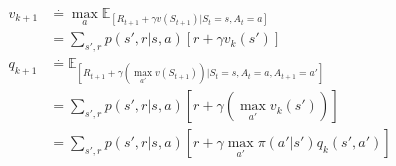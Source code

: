 \documentclass{article}
\begin{document}
\[
  \begin{aligned}
    v_{k+1} & \overset{.}{=} \max_a \mathbb{E}_[ R_{t+1} + \gamma v(S_{t+1})| S_{t}=s, A_{t}=a]\\
    &= \sum_{s',r}p(s',r|s,a)[r+\gamma v_k(s')]\\
    q_{k+1} & \overset{.}{=} \mathbb{E}_[ R_{t+1} + \gamma (\max_{a'} v(S_{t+1}))| S_{t}=s, A_{t}=a, A_{t+1}=a']\\
    &=\sum_{s',r}p(s',r|s,a)[r + \gamma (\max_{a'}v_k(s'))]\\
    &= \sum_{s',r}p(s',r|s,a)[r + \gamma  \max_{a'} \pi(a'|s')q_k(s',a')]
  \end{aligned}
\]
\end{document}

